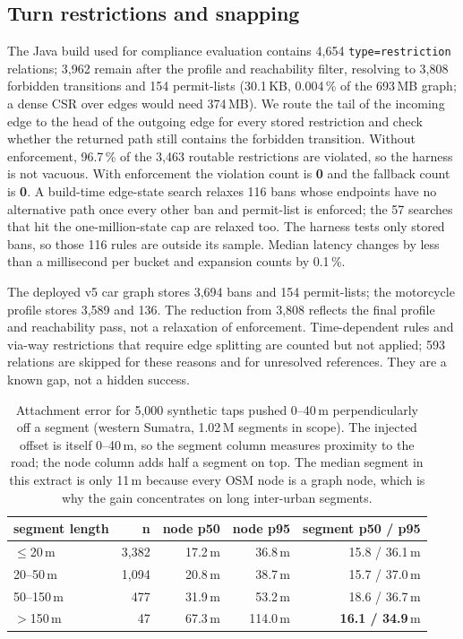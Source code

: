 \documentclass[sigconf,nonacm]{acmart}
\begin{document}
\subsection{Turn restrictions and snapping}
The Java build used for compliance evaluation contains 4{,}654
\texttt{type=restriction} relations; 3{,}962 remain after the profile and
reachability filter, resolving to 3{,}808 forbidden transitions and 154
permit-lists (30.1\,KB, 0.004\,\% of the 693\,MB graph; a dense CSR over edges
would need 374\,MB). We route the tail of the incoming edge to the head of the
outgoing edge for every stored restriction and check whether the returned path
still contains the forbidden transition. Without enforcement, 96.7\,\% of the
3{,}463 routable restrictions are violated, so the harness is not vacuous. With
enforcement the violation count is \textbf{0} and the fallback count is
\textbf{0}. A build-time edge-state search relaxes 116 bans whose endpoints have
no alternative path once every other ban and permit-list is enforced; the 57
searches that hit the one-million-state cap are relaxed too. The harness tests
only stored bans, so those 116 rules are outside its sample. Median latency
changes by less than a millisecond per bucket and expansion counts by 0.1\,\%.

The deployed v5 car graph stores 3{,}694 bans and 154 permit-lists; the motorcycle
profile stores 3{,}589 and 136. The reduction from 3{,}808 reflects the final
profile and reachability pass, not a relaxation of enforcement. Time-dependent
rules and via-way restrictions that require edge splitting are counted but not
applied; 593 relations are skipped for these reasons and for unresolved
references. They are a known gap, not a hidden success.

\begin{table}[t]
\small
\begin{tabular}{@{}lrrrr@{}}
\toprule
segment length & n & node p50 & node p95 & segment p50 / p95 \\
\midrule
$\le$20\,m      & 3{,}382 & 17.2\,m & 36.8\,m & 15.8 / 36.1\,m \\
20--50\,m        & 1{,}094 & 20.8\,m & 38.7\,m & 15.7 / 37.0\,m \\
50--150\,m       &   477   & 31.9\,m & 53.2\,m & 18.6 / 36.7\,m \\
$>$150\,m        &    47   & 67.3\,m & 114.0\,m & \textbf{16.1 / 34.9}\,m \\
\bottomrule
\end{tabular}
\caption{Attachment error for 5{,}000 synthetic taps pushed 0--40\,m
perpendicularly off a segment (western Sumatra, 1.02\,M segments in scope). The
injected offset is itself 0--40\,m, so the segment column measures proximity to
the road; the node column adds half a segment on top. The median segment in this
extract is only 11\,m because every OSM node is a graph node, which is why the
gain concentrates on long inter-urban segments.}
\label{tab:snap}
\end{table}
\end{document}
